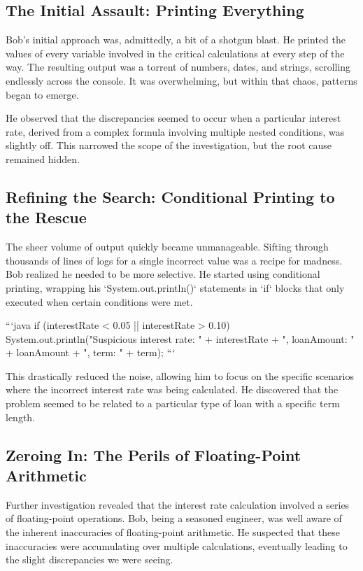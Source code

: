 \documentclass{article}
\begin{document}
{{{{\subsection*{The Initial Assault: Printing Everything}

Bob's initial approach was, admittedly, a bit of a shotgun blast. He printed the values of every variable involved in the critical calculations at every step of the way. The resulting output was a torrent of numbers, dates, and strings, scrolling endlessly across the console. It was overwhelming, but within that chaos, patterns began to emerge.

He observed that the discrepancies seemed to occur when a particular interest rate, derived from a complex formula involving multiple nested conditions, was slightly off. This narrowed the scope of the investigation, but the root cause remained hidden.

\subsection*{Refining the Search: Conditional Printing to the Rescue}

The sheer volume of output quickly became unmanageable. Sifting through thousands of lines of logs for a single incorrect value was a recipe for madness. Bob realized he needed to be more selective. He started using conditional printing, wrapping his `System.out.println()` statements in `if` blocks that only executed when certain conditions were met.

```java
if (interestRate < 0.05 || interestRate > 0.10) {
    System.out.println("Suspicious interest rate: " + interestRate +
                       ", loanAmount: " + loanAmount +
                       ", term: " + term);
}
```

This drastically reduced the noise, allowing him to focus on the specific scenarios where the incorrect interest rate was being calculated. He discovered that the problem seemed to be related to a particular type of loan with a specific term length.

\subsection*{Zeroing In: The Perils of Floating-Point Arithmetic}

Further investigation revealed that the interest rate calculation involved a series of floating-point operations. Bob, being a seasoned engineer, was well aware of the inherent inaccuracies of floating-point arithmetic. He suspected that these inaccuracies were accumulating over multiple calculations, eventually leading to the slight discrepancies we were seeing.

}}}}
\end{document}
